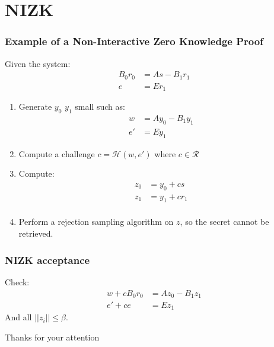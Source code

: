 \documentclass[presentation]{beamer}
\begin{document}
\section{NIZK}
\begin{frame}[label=non-interactive-zero-knowledge-proof]
  \frametitle{Example of a Non-Interactive Zero Knowledge Proof}

  Given the system:
  \begin{equation*}
    \begin{array}{rl}
      B_0r_0 &= As - B_1r_1 \\
      e &= E r_1
    \end{array}
  \end{equation*}

  \begin{enumerate}
    \item Generate $y_0$ $y_1$ small such as:
      \begin{equation*}
        \begin{array}{rl}
          w  &= Ay_0 - B_1y_1 \\
          e' &= E y_1
        \end{array}
      \end{equation*}
    \item Compute a challenge $c = \mathcal H (w, e')$ where
      $c \in \mathcal R$
    \item Compute:
      \begin{equation*}
        \begin{array}{rl}
          z_0 &= y_0 + cs \\
          z_1 &= y_1 + cr_1 \\
        \end{array}
      \end{equation*}
    \item Perform a rejection sampling algorithm on $z$, 
      so the secret cannot be retrieved.
  \end{enumerate}
\end{frame}

\begin{frame}
  \frametitle{NIZK acceptance}

  Check:
  \begin{equation*}
    \begin{array}{rl}
      w + cB_0r_0 &= Az_0 - B_1z_1 \\
      e' + ce &= E z_1
    \end{array}
  \end{equation*}
  And all $||z_i|| \leq \beta$.
\end{frame}

\begin{frame}
  Thanks for your attention
\end{frame}
\end{document}
